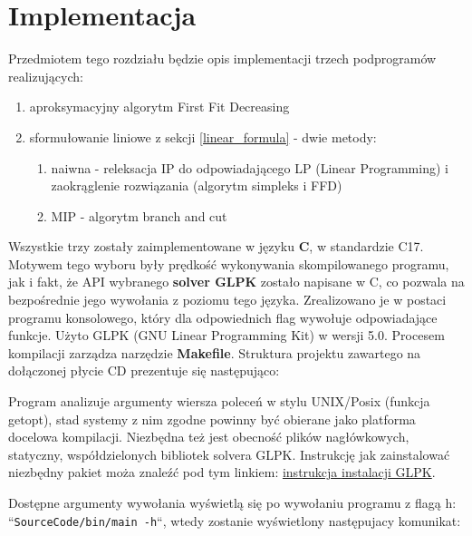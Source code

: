 \chapter{Implementacja}
\thispagestyle{chapterBeginStyle}

Przedmiotem tego rozdziału będzie opis implementacji trzech podprogramów realizujących: 
\begin{enumerate}
	\item aproksymacyjny algorytm First Fit Decreasing 
	\item sformułowanie liniowe z sekcji \ref{linear_formula} - dwie metody:
	\begin{enumerate}
		\item naiwna - releksacja IP do odpowiadającego LP (Linear Programming) i zaokrąglenie rozwiązania (algorytm simpleks i FFD)
		\item MIP - algorytm branch and cut
	\end{enumerate}
	 
\end{enumerate}

Wszystkie trzy zostały zaimplementowane w języku \textbf{C}, w standardzie C17. Motywem tego wyboru były prędkość wykonywania skompilowanego programu, jak i fakt, że API wybranego \textbf{solver GLPK} zostało napisane w C, co pozwala na bezpośrednie jego wywołania z poziomu tego języka\cite{GLPK_API}.
Zrealizowano je w postaci programu konsolowego, który dla odpowiednich flag wywołuje odpowiadające funkcje. Użyto GLPK (GNU Linear Programming Kit) w wersji 5.0. 
Procesem kompilacji zarządza narzędzie \textbf{Makefile}.
Struktura projektu zawartego na dołączonej płycie CD prezentuje się następująco:


Program analizuje argumenty wiersza poleceń w stylu UNIX/Posix (funkcja getopt), stad systemy z nim zgodne powinny być obierane jako platforma docelowa kompilacji. Niezbędna też jest obecność plików nagłówkowych, statyczny, współdzielonych bibliotek solvera GLPK. Instrukcję jak zainstalować niezbędny pakiet moża znaleźć pod tym linkiem: \href{https://en.wikibooks.org/wiki/GLPK/Linux_OS}{instrukcja instalacji GLPK}.

\newpage
Dostępne argumenty wywołania wyświetlą się po wywołaniu programu z flagą h: ``\verb|SourceCode/bin/main -h|``, wtedy zostanie wyświetlony następujacy komunikat:

